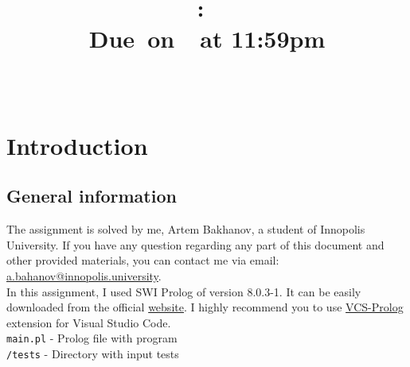 \documentclass{article}
\title{
    \vspace{2in}
    \textmd{\textbf{\hmwkClass:\ \hmwkTitle}}\\
    \normalsize\vspace{0.1in}\small{Due\ on\ \hmwkDueDate\ at 11:59pm}\\
    \vspace{0.1in}\large{\textit{\hmwkClassInstructor\ }}
    \vspace{3in}
}
\author{\hmwkAuthorName}
\date{}
\begin{document}
\maketitle

\pagebreak

\tableofcontents

\pagebreak

\section{Introduction}
\subsection{General information}
    The assignment is solved by me, Artem Bakhanov, a student of Innopolis University. If you have any question regarding any part of this document and other provided materials, you can contact me via email: \href{mailto:a.bahanov@innopolis.university}{a.bahanov@innopolis.university}.\\
    In this assignment, I used SWI Prolog of version 8.0.3-1. It can be easily downloaded from the official \href{https://www.swi-prolog.org/download/stable}{website}. I highly recommend you to use \href{https://marketplace.visualstudio.com/items?itemName=arthurwang.vsc-prolog}{VCS-Prolog} extension for Visual Studio Code. \\
\texttt{main.pl} - Prolog file with program\\
\texttt{/tests} - Directory with input tests\\
\end{document}
